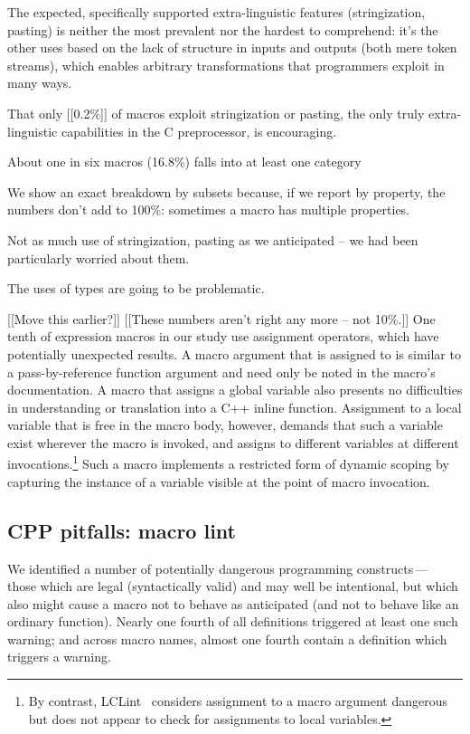 \documentclass[10pt]{article}
\begin{document}
{}


The expected, specifically supported extra-linguistic features
(stringization, pasting) is neither the most prevalent nor the hardest to
comprehend:  it's the other uses based on the lack of structure in inputs
and outputs (both mere token streams), which enables arbitrary
transformations that programmers exploit in many ways.

  That only [[0.2\%]] of macros exploit
stringization or pasting, the only truly extra-linguistic capabilities in
the C preprocessor, is encouraging.

        About one in six macros (16.8\%) falls into at least one category

        We show an exact breakdown by subsets because, if we report by
          property, the numbers don't add to 100\%: sometimes a macro has
          multiple properties.

        Not as much use of stringization, pasting as we anticipated -- we
          had been particularly worried about them.

        The uses of types are going to be problematic.

[[Move this earlier?]]
[[These numbers aren't right any more -- not 10\%.]]
One tenth of expression macros in our study use assignment operators, which
have potentially unexpected results.  A macro argument that is assigned to
is similar to a pass-by-reference function argument and need only be noted in the
macro's documentation.  A macro that assigns a global variable also
presents no difficulties in understanding or translation into a C++
inline function.
Assignment to a local variable that is free in the macro body, however,
demands that such a variable exist wherever the macro is invoked, and
assigns to different variables at different invocations.\footnote{By
  contrast, LCLint~\cite{Evans:LCLint} considers assignment to a macro
  argument dangerous but does not appear to check for assignments to local
  variables.} Such a macro implements a restricted form
of dynamic scoping by capturing the instance of a variable visible at
the point of macro invocation.


\subsection{CPP pitfalls:  macro lint}
\label{sec:lint}

We identified a number of potentially dangerous programming
constructs\,---\, those which are legal (syntactically valid) and may well
be intentional, but which also might cause a macro not to behave as
anticipated (and not to behave like an ordinary function).  Nearly one
fourth of all definitions triggered at least one such warning; and across
macro names, almost one fourth contain a definition which triggers a
warning.
\end{document}
